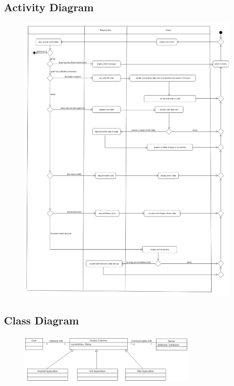 \subsection{Activity Diagram}
\begin{figure}[!htbp]
	\includegraphics[width=\textwidth]{Access_Modules/AcessActivity.png}
\end{figure}

\subsection{Class Diagram}
\begin{figure}[!htbp]
	\includegraphics[width=0.8\textwidth]{Access_Modules/AccessClassDiagramV2.png}
\end{figure}

